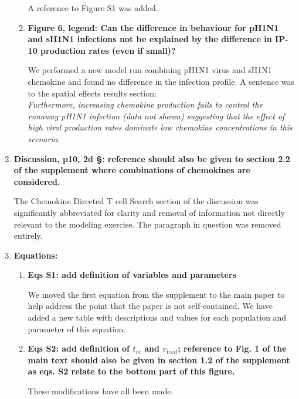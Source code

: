 \documentclass[10pt]{article}
\begin{document}
\begin{enumerate}
\begin{enumerate}
A reference to Figure S1 was added. \\

	\item \textbf{Figure 6, legend: Can the difference in behaviour for pH1N1 and sH1N1 infections not be explained by the difference in IP-10 production rates (even if small)?}
	
We performed a new model run combining pH1N1 virus and sH1N1 chemokine and found no difference in the infection profile.  A sentence was to the spatial effects results section: \\

\textit{Furthermore, increasing chemokine production fails to control the runaway pH1N1 infection (data not shown) suggesting that the effect of high viral production rates dominate low chemokine concentrations in this scenario.} \\
	
\end{enumerate}



\item \textbf{Discussion, p10, 2d §: reference should also be given to section 2.2 of the supplement where combinations of chemokines are considered.}

The Chemokine Directed T cell Search section of the discussion was significantly abbreviated for clarity and removal of information not directly relevant to the modeling exercise.  The paragraph in question was removed entirely. \\

\item \textbf{Equations:}
\begin{enumerate}
	\item \textbf{Eqs S1: add definition of variables and parameters}
	
	We  moved the first equation from the supplement to the main paper to  help address the point that the paper is not self-contained.  We have added a new table with descriptions and values for each population and parameter of this equation. \\

	\item \textbf{Eqs S2: add definition of $t_{rc}$ and $v_{tcell}$; reference to Fig. 1 of the main text should also be given in section 1.2 of the supplement as eqs. S2 relate to the bottom part of this figure.} 
	
	These modifications have all been made. \\


\end{enumerate}
\end{enumerate}
\end{document}
